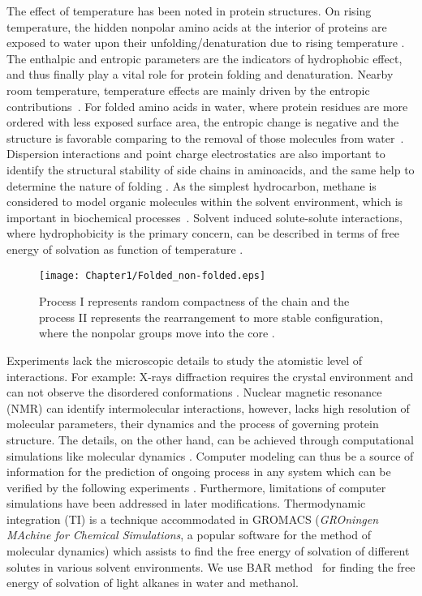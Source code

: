 The effect of temperature has been noted in protein structures. On rising temperature, the hidden nonpolar amino acids at the interior of proteins are exposed to water upon their unfolding/denaturation due to rising temperature \citep{Dill1990}. The enthalpic and entropic parameters are the indicators of hydrophobic effect, and thus finally play a vital role for protein folding and denaturation.
Nearby room temperature, temperature effects are mainly driven by the entropic contributions~\citep{Privalov1988}. For folded amino acids in water, where protein residues are more ordered with less exposed surface area, the entropic change is negative and the structure is favorable comparing to the removal of those molecules from water~\citep{Scott1950}. Dispersion interactions and point charge electrostatics are also important to identify the structural stability of side chains in aminoacids, and the same help to determine the nature of folding \citep{Raschke2001}. As the simplest hydrocarbon, methane is considered to model organic molecules within the solvent environment, which is important in biochemical processes~\citep{Dang1994}. Solvent induced solute-solute interactions, where hydrophobicity is the primary concern, can be described in terms of  free energy of solvation  as function of temperature \citep{Hotta2005, Li2007}.
 
\begin{figure}[h!]
\centering
\texttt{[image: Chapter1/Folded\_non-folded.eps]}
\caption[Random compactness of the chain and the rearrangement to more stable configuration.]{Process I represents random compactness of the chain and the process II represents the rearrangement to more stable configuration, where the nonpolar groups move into the core \citep{Dill1990}.}
\label{folded-nonfolded}
\end{figure}


 
Experiments lack the microscopic details to study the atomistic level of interactions. For example: X-rays diffraction requires the crystal environment and can not observe the disordered conformations \citep{Hwang2011}. Nuclear magnetic resonance (NMR) can identify intermolecular interactions, however, lacks high resolution of molecular parameters, their dynamics and the process of governing protein structure. The details, on the other hand, can be achieved through computational simulations like molecular dynamics \citep{Allen1989}. Computer modeling can thus be a source of information for the prediction of ongoing process in any system which can be verified by the following experiments \citep{Raschke2001}. Furthermore, limitations of computer simulations have been addressed in later modifications. Thermodynamic integration (TI) is a technique accommodated in GROMACS ({\it GROningen MAchine for Chemical Simulations}, a popular software for the method of molecular dynamics) which assists to find the free energy of solvation of different solutes in various solvent environments. We use BAR method~\citep{bennett1976} for finding the free energy of solvation of light alkanes in water and methanol. 

